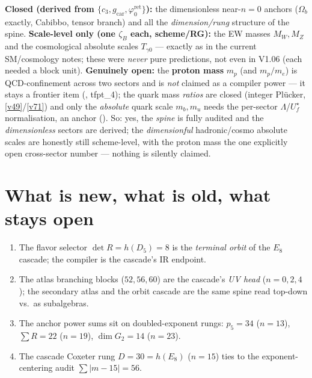 \documentclass[11pt,a4paper]{article}
\newcommand{\gcar}{g_{\mathrm{car}}}
\newcommand{\cthree}{c_3}
\newcommand{\phiz}{\varphi_0^{\mathrm{ret}}}
\theoremstyle{definition}
\begin{document}
\begin{gapbox}
\textbf{Closed (derived from $\{\cthree,\gcar,\phiz\}$):} the dimensionless near-$n{=}0$ anchors
($\Omega_b$ exactly, Cabibbo, tensor branch) and all the \emph{dimension/rung} structure of the spine.
\textbf{Scale-level only (one $\zeta_B$ each, scheme/RG):} the EW masses $M_W,M_Z$ and the cosmological
absolute scales $T_{\gamma0}$ --- exactly as in the current SM/cosmology notes; these were \emph{never}
pure predictions, not even in V1.06 (each needed a block unit). \textbf{Genuinely open:} the
\textbf{proton mass} $m_p$ (and $m_p/m_e$) is QCD-confinement across two sectors and is \emph{not} claimed
as a compiler power --- it stays a frontier item (\mO, tfpt\_4); the quark mass \emph{ratios} are closed
(integer Pl\"ucker, \vref{v49}/\vref{v71}) and only the \emph{absolute} quark scale $m_b,m_u$ needs the per-sector
$\Lambda$/$U_f^\star$ normalisation, an anchor (\mO). So: yes, the \emph{spine} is fully audited and the
\emph{dimensionless} sectors are derived; the \emph{dimensionful} hadronic/cosmo absolute scales are
honestly still scheme-level, with the proton mass the one explicitly open cross-sector number --- nothing
is silently claimed.
\end{gapbox}

\section{What is new, what is old, what stays open}
\begin{keybox}
\begin{enumerate}[leftmargin=1.5em]
\item The flavor selector $\det R=h(D_5)=8$ is the \emph{terminal orbit} of the $E_8$ cascade; the
      compiler is the cascade's IR endpoint. \mE
\item The atlas branching blocks ($52,56,60$) are the cascade's \emph{UV head} ($n=0,2,4$); the secondary
      atlas and the orbit cascade are the same spine read top-down vs.\ as subalgebras. \mE
\item The anchor power sums sit on doubled-exponent rungs: $p_5=34$ ($n{=}13$), $\sum R=22$ ($n{=}19$),
      $\dim G_2=14$ ($n{=}23$). \mE
\item The cascade Coxeter rung $D=30=h(E_8)$ ($n{=}15$) ties to the exponent-centering audit
      $\sum|m{-}15|=56$. \mE
\end{enumerate}
\end{keybox}
\end{document}
